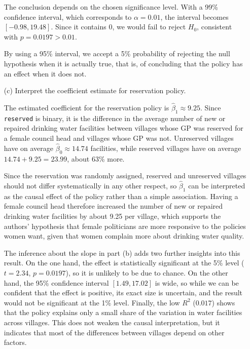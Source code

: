 \documentclass[12pt,letterpaper]{article}
\begin{document}
\begin{enumerate}
		
		
		
		
		\noindent The conclusion depends on the chosen significance level. With a 99\% confidence interval, which corresponds to $\alpha = 0.01$, the interval becomes $[-0.98, 19.48]$. Since it contains 0, we would fail to reject $H_0$, consistent with $p = 0.0197 > 0.01$.
		
		
		
		\noindent By using a 95\% interval, we accept a 5\% probability of rejecting the null hypothesis when it is actually true, that is, of concluding that the policy has an effect when it does not.
		
		\item [(c)] Interpret the coefficient estimate for reservation policy. 
		
		\vspace{.25cm}
		\noindent The estimated coefficient for the reservation policy is $\hat\beta_1 \approx 9.25$. Since \texttt{reserved} is binary, it is the difference in the average number of new or repaired drinking water facilities between villages whose GP was reserved for a female council head and villages whose GP was not. Unreserved villages have on average $\hat\beta_0 \approx 14.74$ facilities, while reserved villages have on average $14.74 + 9.25 = 23.99$, about 63\% more.
		
		\vspace{.25cm}
		\noindent Since the reservation was randomly assigned, reserved and unreserved villages should not differ systematically in any other respect, so $\hat\beta_1$ can be interpreted as the causal effect of the policy rather than a simple association. Having a female council head therefore increased the number of new or repaired drinking water facilities by about 9.25 per village, which supports the authors' hypothesis that female politicians are more responsive to the policies women want, given that women complain more about drinking water quality.
		
		\vspace{.25cm}
		\noindent The inference about the slope in part (b) adds two further insights into this result. On the one hand, the effect is statistically significant at the 5\% level ($t = 2.34$, $p = 0.0197$), so it is unlikely to be due to chance. On the other hand, the 95\% confidence interval $[1.49, 17.02]$ is wide, so while we can be confident that the effect is positive, its exact size is uncertain, and the result would not be significant at the 1\% level. Finally, the low $R^2$ ($0.017$) shows that the policy explains only a small share of the variation in water facilities across villages. This does not weaken the causal interpretation, but it indicates that most of the differences between villages depend on other factors.
	\end{enumerate}
	
	
\end{document}
